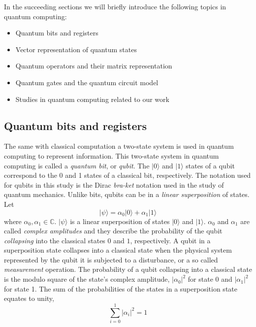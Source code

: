 In the succeeding sections we will briefly introduce the following topics in quantum computing:
\begin{itemize}
	\item Quantum bits and registers
	\item Vector representation of quantum states
	\item Quantum operators and their matrix representation
	\item Quantum gates and the quantum circuit model
	\item Studies in quantum computing related to our work
\end{itemize}

\subsection{Quantum bits and registers}
The same with classical computation a two-state system is used in quantum computing to represent information. This two-state system in quantum computing is called a \textit{quantum bit}, or \textit{qubit}. The $\vert 0 \rangle$ and $\vert 1 \rangle$ states of a qubit correspond to the 0 and 1 states of a classical bit, respectively. The notation used for qubits in this study is the Dirac \textit{bra-ket} notation used in the study of quantum mechanics. Unlike bits, qubits can be in a \textit{linear superposition} of states. Let 
\[
	\vert \psi \rangle = \alpha_0 \vert 0 \rangle + \alpha_1 \vert 1 \rangle
\]
where $\alpha_0, \alpha_1 \in \mathbb{C}$. $\vert \psi \rangle$ is a linear superposition of states $\vert 0 \rangle$ and $\vert 1 \rangle$. $\alpha_0$ and $\alpha_1$ are called \textit{complex amplitudes} and they describe the probability of the qubit \textit{collapsing} into the classical states $0$ and $1$, respectively. A qubit in a superposition state collapses into a classical state when the physical system represented by the qubit it is subjected to a disturbance, or a so called \textit{measurement} operation. The probability of a qubit collapsing into a classical state is the modulo square of the state's complex amplitude, $\vert \alpha_0 \vert^2$ for state 0 and $\vert \alpha_1 \vert^2$ for state 1. The sum of the probabilities of the states in a superposition state equates to unity,
\begin{equation}
	\sum_{i=0}^{1} \vert \alpha_i \vert^2 = 1
\end{equation}

